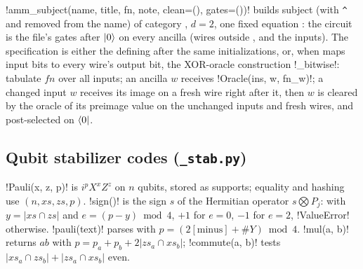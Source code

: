 \py!amm_subject(name, title, fn, note, clean=(), gates=())! builds subject
 (with \texttt{\^{}} and \code{-} removed from the name) of category
, $d = 2$, one fixed equation : the circuit is the file's gates after
$\lvert 0 \rangle$ on every ancilla (wires outside , and the  inputs). The
specification is either the defining  after the same initializations, or, when
 maps input bits to every wire's output bit, the XOR-oracle construction
\py!_bitwise!: tabulate $\mathit{fn}$ over all inputs; an ancilla $w$ receives
\py!Oracle(ins, w, fn_w)!; a changed input $w$ receives its image on a fresh wire 
right after it, then $w$ is cleared by the oracle of its preimage value on the unchanged inputs
and fresh wires, and post-selected on $\langle 0 \rvert$.

\subsection{Qubit stabilizer codes (\texttt{\_stab.py})}

\py!Pauli(x, z, p)! is $i^pX^xZ^z$ on $n$ qubits, stored as supports; equality and hashing use
$(n, \mathit{xs}, \mathit{zs}, p)$. \py!sign()! is the sign $s$ of the Hermitian operator
$s\bigotimes P_j$: with $y = |\mathit{xs}\cap\mathit{zs}|$ and $e=(p-y)\bmod4$, $+1$ for $e=0$,
$-1$ for $e=2$, \py!ValueError! otherwise. \py!pauli(text)! parses  with
$p = (2[\text{minus}] + \#Y)\bmod 4$. \py!mul(a, b)! returns $ab$ with
$p = p_a + p_b + 2|\mathit{zs}_a\cap\mathit{xs}_b|$; \py!commute(a, b)! tests
$|\mathit{xs}_a\cap\mathit{zs}_b| + |\mathit{zs}_a\cap\mathit{xs}_b|$ even.

